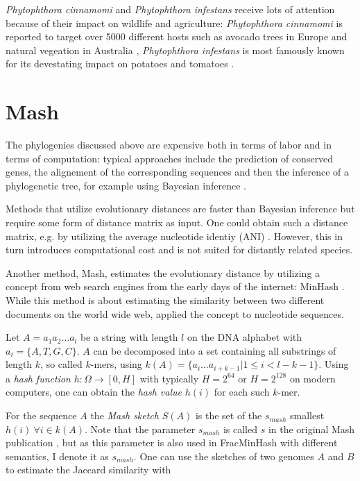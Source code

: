 \textit{Phytophthora cinnamomi} and \textit{Phytophthora infestans} receive lots
of attention because of their impact on wildlife and agriculture:
\textit{Phytophthora cinnamomi} is reported to target over 5000 different hosts
such as avocado trees in Europe and natural vegeation in Australia
\cite{hardhamPhytophthoraCinnamomi2018,solis-garciaPhytophthoraRootRot2020},
\textit{Phytophthora infestans} is most famously known for its devestating
impact on potatoes and tomatoes \cite{ayala-usmaWholeGenomeDuplication2021}.


\section{Mash}
The phylogenies discussed above are expensive both in terms of labor and in
terms of computation: typical approaches include the prediction of conserved
genes, the alignement of the corresponding sequences and then the inference of a
phylogenetic tree, for example using Bayesian inference
\cite{abadPhytophthoraTaxonomicPhylogenetic2023a,winkworthComparativeAnalysesComplete2022}.

Methods that utilize evolutionary distances
\cite{saitouNeighborjoiningMethodNew1987} are faster  than Bayesian
inference but require some form of distance matrix as input. One could obtain
such a distance matrix, e.g. by utilizing the average nucleotide identiy (ANI)
\cite{leeOrthoANIImprovedAlgorithm2016}. However, this in turn introduces
computational cost and is not suited for distantly related species.

Another method, Mash, estimates the evolutionary distance by utilizing a concept
from web search engines from the early days of the internet: MinHash
\cite{broderResemblanceContainmentDocuments1998a,ondovMashFastGenome2016}. While
this method is about estimating the similarity between two different documents
on the world wide web,  applied the concept
to nucleotide sequences.

Let $A = a_1 a_2 \dots a_l$ be a string with length $l$ on the DNA alphabet with
$a_i = \{A, T, G, C\}$. $A$ can be decomposed into a set containing all
substrings of length $k$, so called $k$-mers, using $k(A) = \{a_i \dots
a_{i+k-1} | 1 \leq i < l-k-1\}$. Using a \textit{hash function} $h: \Omega
\rightarrow [0, H]$ with typically $H=2^{64}$ or $H=2^{128}$ on modern
computers, one can obtain the \textit{hash value} $h(i)$ for each such $k$-mer.

For the sequence $A$ the \textit{Mash sketch} $S(A)$ is the set of the
$s_{mash}$ smallest $h(i) ~ \forall i \in k(A)$. Note that the parameter
$s_{mash}$ is called $s$ in the original Mash publication
\cite{ondovMashFastGenome2016}, but as this parameter is also used in
FracMinHash with different semantics, I denote it as $s_{mash}$. One can use the
sketches of two genomes $A$ and $B$ to estimate the Jaccard similarity with 

